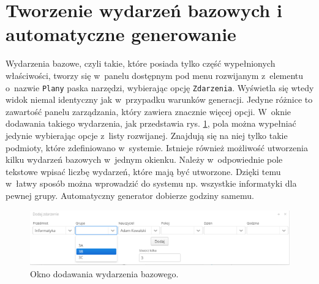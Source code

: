 \documentclass[a4paper]{book}
\begin{document}
{\section{Tworzenie wydarzeń bazowych i automatyczne generowanie}
Wydarzenia bazowe, czyli takie, które posiada tylko część wypełnionych właściwości, tworzy się w~panelu dostępnym pod menu rozwijanym z~elementu o~nazwie \lstinline|Plany| paska narzędzi, wybierając opcję \lstinline|Zdarzenia|. Wyświetla się wtedy widok niemal identyczny jak w~przypadku warunków generacji. Jedyne różnice to zawartość panelu zarządzania, który zawiera znacznie więcej opcji. W~oknie dodawania takiego wydarzenia, jak przedstawia rys. \ref{id:fig:wydBazowe1}, pola można wypełniać jedynie wybierając opcje z~listy rozwijanej. Znajdują się na niej tylko takie podmioty, które zdefiniowano w~systemie. Istnieje również możliwość utworzenia kilku wydarzeń bazowych w~jednym okienku. Należy w~odpowiednie pole tekstowe wpisać liczbę wydarzeń, które mają być utworzone. Dzięki temu w~łatwy sposób można wprowadzić do systemu np. wszystkie informatyki dla pewnej grupy. Automatyczny generator dobierze godziny samemu.
\begin{figure}
	\centering
	\includegraphics[width=1.0\textwidth]{./img/wydBazowe.png}
	\caption{Okno dodawania wydarzenia bazowego.}
	\label{id:fig:wydBazowe1}
\end{figure}

}
\end{document}
